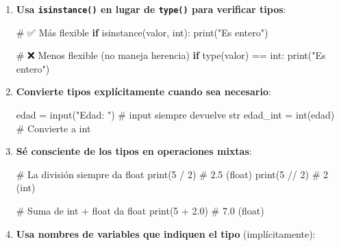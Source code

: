 \documentclass[
  doc,
  floatsintext,
  longtable,
  a4paper,
  nolmodern,
  notxfonts,
  notimes,
  12pt,
  colorlinks=true,linkcolor=blue,citecolor=blue,urlcolor=blue]{apa7}
\newenvironment{Shaded}{\begin{snugshade}}{\end{snugshade}}
\newcommand{\BuiltInTok}[1]{\textcolor[rgb]{0.00,0.23,0.31}{#1}}
\newcommand{\CommentTok}[1]{\textcolor[rgb]{0.37,0.37,0.37}{#1}}
\newcommand{\ControlFlowTok}[1]{\textcolor[rgb]{0.00,0.23,0.31}{\textbf{#1}}}
\newcommand{\DecValTok}[1]{\textcolor[rgb]{0.68,0.00,0.00}{#1}}
\newcommand{\FloatTok}[1]{\textcolor[rgb]{0.68,0.00,0.00}{#1}}
\newcommand{\NormalTok}[1]{\textcolor[rgb]{0.00,0.23,0.31}{#1}}
\newcommand{\OperatorTok}[1]{\textcolor[rgb]{0.37,0.37,0.37}{#1}}
\newcommand{\StringTok}[1]{\textcolor[rgb]{0.13,0.47,0.30}{#1}}
\begin{document}
\begin{enumerate}
\def\labelenumi{\arabic{enumi}.}
\item
  \textbf{Usa \texttt{isinstance()} en lugar de \texttt{type()} para
  verificar tipos}:

\begin{Shaded}
\begin{Highlighting}[]
\CommentTok{\# ✅ Más flexible}
\ControlFlowTok{if} \BuiltInTok{isinstance}\NormalTok{(valor, }\BuiltInTok{int}\NormalTok{):}
    \BuiltInTok{print}\NormalTok{(}\StringTok{"Es entero"}\NormalTok{)}

\CommentTok{\# ❌ Menos flexible (no maneja herencia)}
\ControlFlowTok{if} \BuiltInTok{type}\NormalTok{(valor) }\OperatorTok{==} \BuiltInTok{int}\NormalTok{:}
    \BuiltInTok{print}\NormalTok{(}\StringTok{"Es entero"}\NormalTok{)}
\end{Highlighting}
\end{Shaded}
\item
  \textbf{Convierte tipos explícitamente cuando sea necesario}:

\begin{Shaded}
\begin{Highlighting}[]
\NormalTok{edad }\OperatorTok{=} \BuiltInTok{input}\NormalTok{(}\StringTok{"Edad: "}\NormalTok{)  }\CommentTok{\# input siempre devuelve str}
\NormalTok{edad\_int }\OperatorTok{=} \BuiltInTok{int}\NormalTok{(edad)    }\CommentTok{\# Convierte a int}
\end{Highlighting}
\end{Shaded}
\item
  \textbf{Sé consciente de los tipos en operaciones mixtas}:

\begin{Shaded}
\begin{Highlighting}[]
\CommentTok{\# La división siempre da float}
\BuiltInTok{print}\NormalTok{(}\DecValTok{5} \OperatorTok{/} \DecValTok{2}\NormalTok{)   }\CommentTok{\# 2.5 (float)}
\BuiltInTok{print}\NormalTok{(}\DecValTok{5} \OperatorTok{//} \DecValTok{2}\NormalTok{)  }\CommentTok{\# 2 (int)}

\CommentTok{\# Suma de int + float da float}
\BuiltInTok{print}\NormalTok{(}\DecValTok{5} \OperatorTok{+} \FloatTok{2.0}\NormalTok{) }\CommentTok{\# 7.0 (float)}
\end{Highlighting}
\end{Shaded}
\item
  \textbf{Usa nombres de variables que indiquen el tipo}
  (implícitamente):


\end{enumerate}
\end{document}
